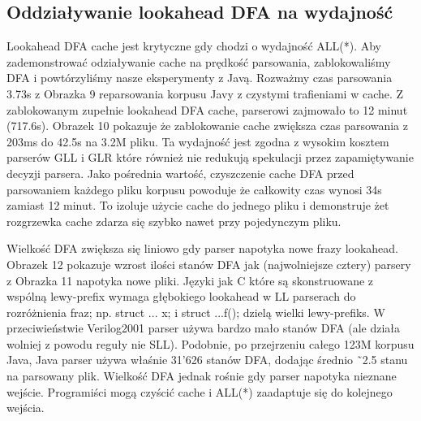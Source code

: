 ﻿\subsection{Oddziaływanie lookahead DFA na wydajność}
Lookahead DFA cache jest krytyczne gdy chodzi o wydajność ALL(*).
Aby zademonstrować odziaływanie cache na prędkość parsowania, zablokowaliśmy DFA
i powtórzyliśmy nasze eksperymenty z Javą.
Rozważmy czas parsowania 3.73s z Obrazka 9 reparsowania korpusu Javy z czystymi
trafieniami w cache.
Z zablokowanym zupełnie lookahead DFA cache, parserowi zajmowało to 12 minut (717.6s).
Obrazek 10 pokazuje że zablokowanie cache zwiększa czas parsowania z 203ms do 42.5s na 3.2M pliku.
Ta wydajność jest zgodna z wysokim kosztem parserów GLL i GLR które również nie redukują
spekulacji przez zapamiętywanie decyzji parsera.
Jako pośrednia wartość, czyszczenie cache DFA przed parsowaniem każdego pliku
korpusu powoduje że całkowity czas wynosi 34s zamiast 12 minut.
To izoluje użycie cache do jednego pliku i demonstruje żet rozgrzewka cache
zdarza się szybko nawet przy pojedynczym pliku.
\par
Wielkość DFA zwiększa się liniowo gdy parser napotyka nowe frazy lookahead.
Obrazek 12 pokazuje wzrost ilości stanów DFA jak (najwolniejsze cztery) parsery z Obrazka 11
napotyka nowe pliki. Języki jak C które są skonstruowane z
wspólną lewy-prefix wymaga głębokiego lookahead w LL parserach do
rozróżnienia fraz; np. struct {...} x; i struct {...}f(); dzielą wielki lewy-prefiks.
W przeciwieństwie Verilog2001 parser używa bardzo mało stanów DFA
(ale działa wolniej z powodu reguły nie SLL). Podobnie, po przejrzeniu całego 123M korpusu Java,
Java parser używa właśnie 31'626 stanów DFA, dodając średnio  ˜2.5 stanu na parsowany plik.
Wielkość DFA jednak rośnie gdy parser napotyka nieznane wejście.
Programiści mogą czyścić cache i ALL(*) zaadaptuje się do kolejnego wejścia.

